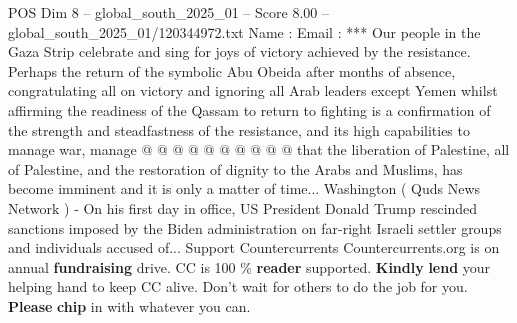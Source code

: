 \begin{textsample}{POS Dim 8 – global\_south\_2025\_01 – Score 8.00 – global\_south\_2025\_01/120344972.txt}
Name : Email : *** Our people in the Gaza Strip celebrate and sing for joys of victory achieved by the resistance.
Perhaps the return of the symbolic Abu Obeida after months of absence, congratulating all on victory and ignoring all Arab leaders except Yemen whilst affirming the readiness of the Qassam to return to fighting is a confirmation of the strength and steadfastness of the resistance, and its high capabilities to manage war, manage @ @ @ @ @ @ @ @ @ @ that the liberation of Palestine, all of Palestine, and the restoration of dignity to the Arabs and Muslims, has become imminent and it is only a matter of time...
Washington ( Quds News Network ) - On his first day in office, US President Donald Trump rescinded sanctions imposed by the Biden administration on far-right Israeli settler groups and individuals accused of...
Support Countercurrents Countercurrents.org is on annual \textbf{fundraising} drive.
CC is 100 \% \textbf{reader} supported. \textbf{Kindly} \textbf{lend} your helping hand to keep CC alive.
Don't wait for others to do the job for you. \textbf{Please} \textbf{chip} in with whatever you can.

\end{textsample}
